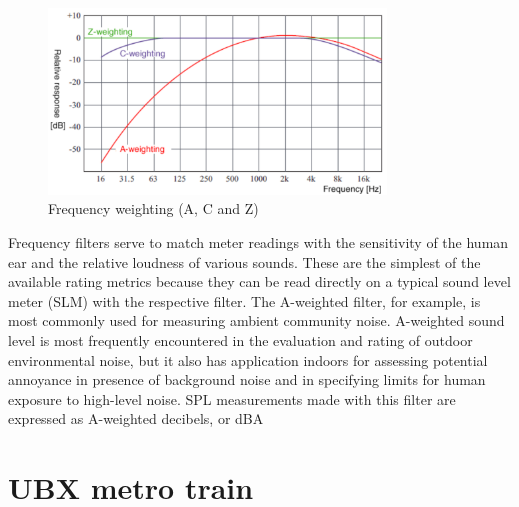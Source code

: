 \begin{figure}[H]
	\centering
	\includegraphics[width=0.8\textwidth]{fig/frequency_weighting.png}
	\caption{Frequency weighting (A, C and Z) \cite{Frquency_weighting}}
	\label{fig:weighting}
\end{figure}

Frequency filters serve to match meter readings with the sensitivity of the human ear
and the relative loudness of various sounds. These are the simplest of the available
rating metrics because they can be read directly on a typical sound level meter
(SLM) with the respective filter.
The A-weighted filter, for example, is most commonly used for measuring ambient
community noise. A-weighted sound level is most frequently encountered in the
evaluation and rating of outdoor environmental noise, but it also has application
indoors for assessing potential annoyance in presence of background noise and in
specifying limits for human exposure to high-level noise. SPL measurements made
with this filter are expressed as A-weighted decibels, or dBA

\newpage
\section{UBX metro train}
\label{section:ubx_geometry}